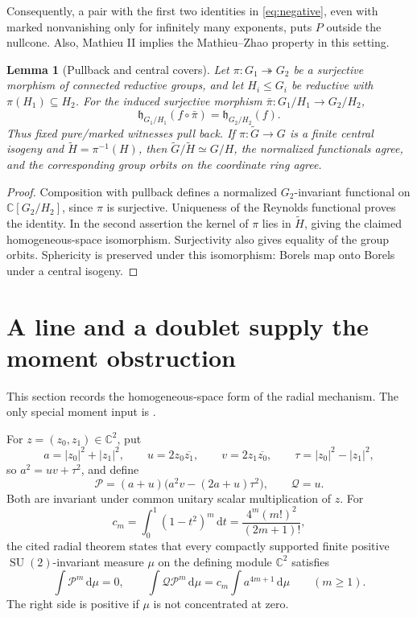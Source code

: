 \documentclass[11pt]{article}
\numberwithin{equation}{section}
\newtheorem{lemma}[theorem]{Lemma}
\theoremstyle{definition}
\theoremstyle{remark}
\newcommand{\C}{\mathbb C}
\newcommand{\dd}{\,\mathrm d}
\DeclareMathOperator{\SU}{SU}
\begin{document}
Consequently, a pair with the first two identities in \eqref{eq:negative}, even with marked nonvanishing only for infinitely many exponents, puts $P$ outside the nullcone. Also, Mathieu II implies the Mathieu--Zhao property in this setting.

\begin{lemma}[Pullback and central covers]\label{lem:pullback}
Let $\pi:G_1\twoheadrightarrow G_2$ be a surjective morphism of connected reductive groups, and let $H_i\leq G_i$ be reductive with $\pi(H_1)\subseteq H_2$. For the induced surjective morphism $\bar\pi:G_1/H_1\to G_2/H_2$,
\[
 \mathfrak h_{G_1/H_1}(f\circ\bar\pi)=\mathfrak h_{G_2/H_2}(f).
\]
Thus fixed pure/marked witnesses pull back. If $\pi:\widetilde G\to G$ is a finite central isogeny and $\widetilde H=\pi^{-1}(H)$, then $\widetilde G/\widetilde H\simeq G/H$, the normalized functionals agree, and the corresponding group orbits on the coordinate ring agree.
\end{lemma}
\begin{proof}
Composition with pullback defines a normalized $G_2$-invariant functional on $\C[G_2/H_2]$, since $\pi$ is surjective. Uniqueness of the Reynolds functional proves the identity. In the second assertion the kernel of $\pi$ lies in $\widetilde H$, giving the claimed homogeneous-space isomorphism. Surjectivity also gives equality of the group orbits. Sphericity is preserved under this isomorphism: Borels map onto Borels under a central isogeny.
\end{proof}

\section{A line and a doublet supply the moment obstruction}\label{sec:line}
This section records the homogeneous-space form of the radial mechanism. The only special moment input is \cite[Theorem~4.1]{Long}.

For $z=(z_0,z_1)\in\C^2$, put
\begin{equation}\label{eq:hopf}
 a=|z_0|^2+|z_1|^2,\qquad
 u=2z_0\overline{z_1},\qquad
 v=2z_1\overline{z_0},\qquad
 \tau=|z_0|^2-|z_1|^2,
\end{equation}
so $a^2=uv+\tau^2$, and define
\begin{equation}\label{eq:radialpair}
 \mathscr P=(a+u)\bigl(a^2v-(2a+u)\tau^2\bigr),\qquad
 \mathscr Q=u.
\end{equation}
Both are invariant under common unitary scalar multiplication of $z$. For
\begin{equation}\label{eq:cm}
 c_m=\int_0^1(1-t^2)^m\dd t=\frac{4^m(m!)^2}{(2m+1)!},
\end{equation}
the cited radial theorem states that every compactly supported finite positive $\SU(2)$-invariant measure $\mu$ on the defining module $\C^2$ satisfies
\begin{equation}\label{eq:radial}
 \int\mathscr P^m\dd\mu=0,\qquad
 \int\mathscr Q\mathscr P^m\dd\mu
 =c_m\int a^{4m+1}\dd\mu\qquad(m\geq1).
\end{equation}
The right side is positive if $\mu$ is not concentrated at zero.
\end{document}
